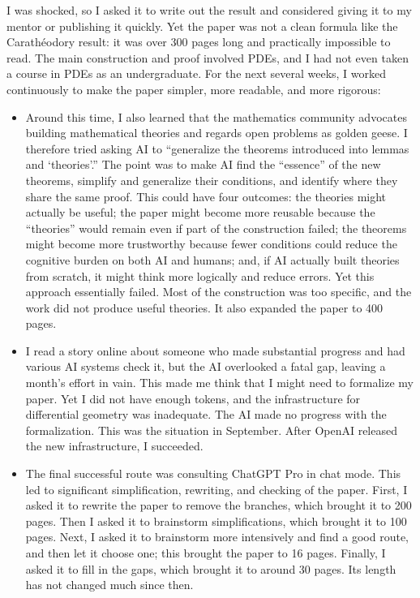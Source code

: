 \documentclass[11pt]{amsart}
\theoremstyle{definition}
\theoremstyle{remark}
\numberwithin{equation}{section}
\begin{document}
I was shocked, so I asked it to write out the result and considered
giving it to my mentor or publishing it quickly. Yet the paper was not
a clean formula like the Carath\'eodory result: it was over 300 pages
long and practically impossible to read. The main construction and
proof involved PDEs, and I had not even taken a course in PDEs as an
undergraduate. For the next several weeks, I worked continuously to
make the paper simpler, more readable, and more rigorous:
\begin{itemize}
\item Around this time, I also learned that the mathematics community
advocates building mathematical theories and regards open problems as
golden geese. I therefore tried asking AI to ``generalize the theorems
introduced into lemmas and `theories'.'' The point was to make AI find
the ``essence'' of the new theorems, simplify and generalize their
conditions, and identify where they share the same proof. This could
have four outcomes: the theories might actually be useful; the paper
might become more reusable because the ``theories'' would remain even
if part of the construction failed; the theorems might become more
trustworthy because fewer conditions could reduce the cognitive burden
on both AI and humans; and, if AI actually built theories from scratch,
it might think more logically and reduce errors. Yet this approach
essentially failed. Most of the construction was too specific, and
the work did not produce useful theories. It also expanded the paper
to 400 pages.
\item I read a story online about someone who made substantial progress
and had various AI systems check it, but the AI overlooked a fatal gap,
leaving a month's effort in vain. This made me think that I might need
to formalize my paper. Yet I did not have enough tokens, and the
infrastructure for differential geometry was inadequate. The AI made
no progress with the formalization. This was the situation in September.
After OpenAI released the new infrastructure, I succeeded.
\item The final successful route was consulting ChatGPT Pro in chat
mode. This led to significant simplification, rewriting, and checking
of the paper. First, I asked it to rewrite the paper to remove the
branches, which brought it to 200 pages. Then I asked it to brainstorm
simplifications, which brought it to 100 pages. Next, I asked it to
brainstorm more intensively and find a good route, and then let it
choose one; this brought the paper to 16 pages. Finally, I asked it
to fill in the gaps, which brought it to around 30 pages. Its length
has not changed much since then.
\end{itemize}
\end{document}
